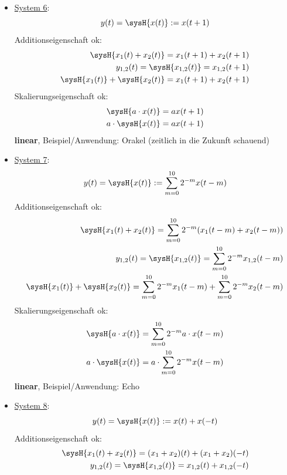 \begin{Loesung}
\begin{itemize}
\item  \underline{System 6}:
\begin{equation}
y(t) = \sysH{x(t)}:= x(t+1)
\end{equation}
Additionseigenschaft ok:
\begin{align}
\sysH{x_1(t)+x_2(t)} = x_1(t+1) + x_2(t+1)\\
y_{1,2}(t) = \sysH{x_{1,2}(t)}= x_{1,2}(t+1)\\
\sysH{x_1(t)} + \sysH{x_2(t)} = x_1(t+1) + x_2(t+1)
\end{align}
Skalierungseigenschaft ok:
\begin{align}
\sysH{a \cdot x(t)}= a x(t+1)\\
a \cdot \sysH{x(t)}= a x(t+1)
\end{align}
\textbf{linear}, Beispiel/Anwendung: Orakel (zeitlich in die Zukunft schauend)
\item  \underline{System 7}:
\begin{equation}
y(t) = \sysH{x(t)}:= \sum_{m=0}^{10} 2^{-m} x(t-m)
\end{equation}
Additionseigenschaft ok:
\begin{align}
\sysH{x_1(t)+x_2(t)}=\sum_{m=0}^{10} 2^{-m} (x_1(t-m)+x_2(t-m))\\
y_{1,2}(t) = \sysH{x_{1,2}(t)}= \sum_{m=0}^{10} 2^{-m} x_{1,2}(t-m)\\
\sysH{x_1(t)} + \sysH{x_2(t)} = \sum_{m=0}^{10} 2^{-m} x_1(t-m) + \sum_{m=0}^{10} 2^{-m} x_2(t-m)
\end{align}
Skalierungseigenschaft ok:
\begin{align}
\sysH{a \cdot x(t)}= \sum_{m=0}^{10} 2^{-m} a \cdot x(t-m)\\
a \cdot \sysH{x(t)}= a \cdot \sum_{m=0}^{10} 2^{-m} x(t-m)
\end{align}
\textbf{linear}, Beispiel/Anwendung: Echo
\item  \underline{System 8}:
\begin{equation}
y(t) = \sysH{x(t)}:= x(t) + x(-t)
\end{equation}
Additionseigenschaft ok:
\begin{align}
\sysH{x_1(t)+x_2(t)}=(x_1+x_2)(t)+(x_1+x_2)(-t)\\
y_{1,2}(t) = \sysH{x_{1,2}(t)}= x_{1,2}(t)+x_{1,2}(-t)\\

\end{align}
\end{itemize}
\end{Loesung}
